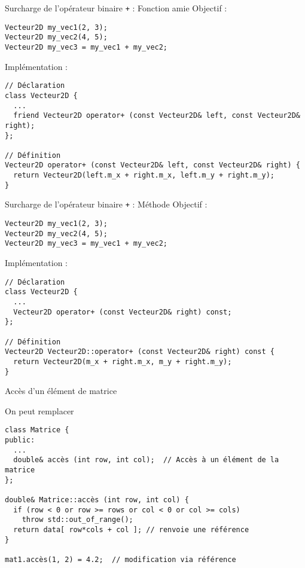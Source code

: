 \documentclass[c]{beamer}
\begin{document}
\begin{frame}[fragile,label={sec:orgheadline7}]{Surcharge de l'opérateur binaire \texttt{+} : Fonction amie}
Objectif :
\begin{verbatim}
Vecteur2D my_vec1(2, 3);
Vecteur2D my_vec2(4, 5);
Vecteur2D my_vec3 = my_vec1 + my_vec2;
\end{verbatim}
\pause
\vspace{1em}
Implémentation :
\begin{verbatim}
// Déclaration
class Vecteur2D {
  ...
  friend Vecteur2D operator+ (const Vecteur2D& left, const Vecteur2D& right);
};

// Définition
Vecteur2D operator+ (const Vecteur2D& left, const Vecteur2D& right) {
  return Vecteur2D(left.m_x + right.m_x, left.m_y + right.m_y);
}
\end{verbatim}
\end{frame}


\begin{frame}[fragile]{Surcharge de l'opérateur binaire \texttt{+} : Méthode}
Objectif :
\begin{verbatim}
Vecteur2D my_vec1(2, 3);
Vecteur2D my_vec2(4, 5);
Vecteur2D my_vec3 = my_vec1 + my_vec2;
\end{verbatim}
\vspace{1em}
Implémentation :
\begin{verbatim}
// Déclaration
class Vecteur2D {
  ...
  Vecteur2D operator+ (const Vecteur2D& right) const;
};

// Définition
Vecteur2D Vecteur2D::operator+ (const Vecteur2D& right) const {
  return Vecteur2D(m_x + right.m_x, m_y + right.m_y);
}
\end{verbatim}
\end{frame}


\begin{frame}[fragile]{Accès d'un élément de matrice}

On peut remplacer
\begin{verbatim}
class Matrice {
public:
  ...
  double& accès (int row, int col);  // Accès à un élément de la matrice
};

double& Matrice::accès (int row, int col) {
  if (row < 0 or row >= rows or col < 0 or col >= cols)
    throw std::out_of_range();
  return data[ row*cols + col ]; // renvoie une référence
}

mat1.accès(1, 2) = 4.2;  // modification via référence
\end{verbatim}

\end{frame}
\end{document}
